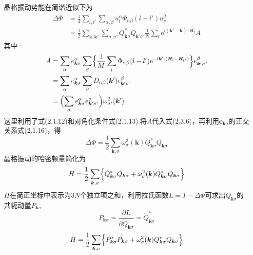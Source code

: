 晶格振动势能在简谐近似下为
\begin{equation}
\begin{aligned}
  \Delta\Phi&=\frac{1}{2}\sum_{l,l'}\sum_{\alpha,\beta}
  u_l^{\alpha}\Phi_{\alpha\beta}(l-l')u_{l'}^{\beta}\\
  &=\frac{1}{2}\sum_{\boldsymbol{k},\boldsymbol{k}'}\sum_{\sigma,\sigma'}
  Q_{\boldsymbol{k}\sigma}^{*}Q_{\boldsymbol{k}'\sigma'}
  \frac{1}{N}\sum_l\mathrm{e}^{\mathrm{i}(\boldsymbol{k}'-\boldsymbol{k})\cdot\boldsymbol{R}_l}A
\end{aligned}
\end{equation}
其中
\begin{equation*}
\begin{aligned}
  A&=\sum_{\alpha}e_{\boldsymbol{k}\sigma}^{\alpha}\sum_{\beta}
  \Bigl\{\frac{1}{M}\sum_l\Phi_{\alpha\beta}(l-l')
  \mathrm{e}^{-\mathrm{i}\boldsymbol{k}'\cdot(\boldsymbol{R}_l-\boldsymbol{R}_{l'})}\Bigr\}
  e_{\boldsymbol{k}'\sigma'}^{\beta}\\
  &=\sum_{\alpha}e_{\boldsymbol{k}\sigma}^{\alpha}\sum_{\beta}
  D_{\alpha\beta}(\boldsymbol{k}')e_{\boldsymbol{k}'\sigma'}^{\beta}\\
  &=\Bigl(\sum_{\alpha}e_{\boldsymbol{k}\sigma}^{\alpha}e_{\boldsymbol{k}'\sigma'}^{\alpha}\Bigr)
  \omega_{\sigma'}^2(\boldsymbol{k}')
\end{aligned}
\end{equation*}
这里利用了式(2.1.12)和对角化条件式(2.1.13).将$A$代入式(2.3.6)，再利用$\boldsymbol{e}_{\boldsymbol{k}\sigma}$的正交关系式(2.1.16)，得
\begin{equation}
  \Delta\Phi=\frac{1}{2}\sum_{\boldsymbol{k},\sigma}
  \omega_{\sigma}^2(\boldsymbol{k})Q_{\boldsymbol{k}\sigma}^{*}Q_{\boldsymbol{k}\sigma}
\end{equation}
晶格振动的哈密顿量简化为
\begin{equation*}
  H=\frac{1}{2}\sum_{\boldsymbol{k},\sigma}\Bigl\{\dot{Q}_{\boldsymbol{k}\sigma}^{*}\dot{Q}_{\boldsymbol{k}\sigma}
  +\omega_{\sigma}^2(\boldsymbol{k})Q_{\boldsymbol{k}\sigma}^{*}Q_{\boldsymbol{k}\sigma}\Bigr\}
\end{equation*}
$H$在简正坐标中表示为$3N$个独立项之和，利用拉氏函数$L=T-\Delta\Phi$可求出$Q_{\boldsymbol{k}\sigma}$的共轭动量$P_{\boldsymbol{k}\sigma}$
\begin{equation}
  P_{\boldsymbol{k}\sigma}=\frac{\partial L}{\partial\dot{Q}_{\boldsymbol{k}\sigma}}
  =\dot{Q}_{\boldsymbol{k}\sigma}^{*}
\end{equation}
\begin{equation}
  H=\frac{1}{2}\sum_{\boldsymbol{k},\sigma}\Bigl\{P_{\boldsymbol{k}\sigma}^{*}P_{\boldsymbol{k}\sigma}
  +\omega_{\sigma}^2(\boldsymbol{k})Q_{\boldsymbol{k}\sigma}^{*}Q_{\boldsymbol{k}\sigma}\Bigr\}
\end{equation}
